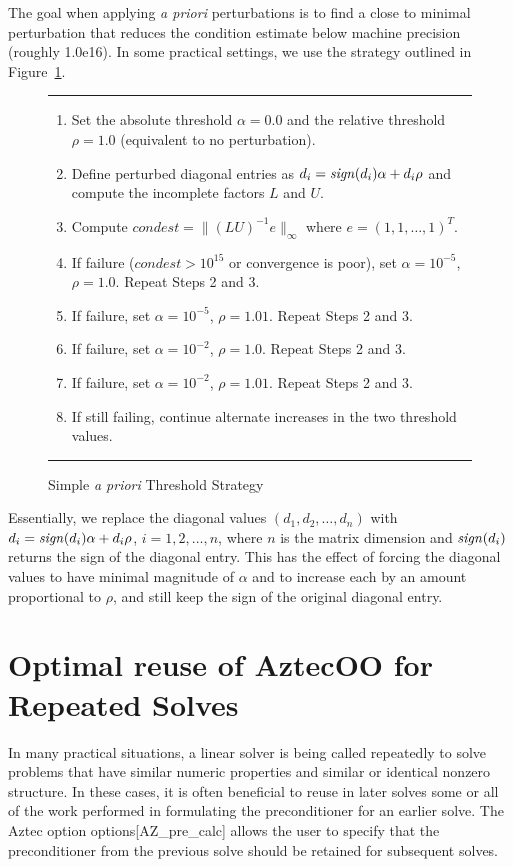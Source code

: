 \documentclass[12pt,relax]{AztecOOUserGuide}
\newcommand{\sign}{{\it sign}}
\begin{document}
The goal when applying {\it a priori} perturbations is to find a close to minimal
perturbation that reduces the condition estimate below machine
precision (roughly 1.0e16).  In some practical settings, 
we use the strategy outlined in
Figure~\ref{f:aprioristrategy}.
{\small
\begin{figure}
\vspace{.05in}
\hrule
\vspace{.1in}
\begin{enumerate}
\item Set the absolute threshold $\alpha = 0.0$ and the relative
threshold $\rho = 1.0$ (equivalent to no perturbation).
\item Define perturbed diagonal entries as $d_{i} = \sign(d_i)\alpha +
d_i\rho$ and compute the incomplete factors $L$ and $U$.
\item Compute $condest = \|(LU)^{-1}e\|_\infty$ where $e = (1, 1,
\ldots, 1)^T$.
\item If failure ($condest > 10^{15}$ or convergence is poor), set $\alpha =
10^{-5}$, $\rho = 1.0$.  Repeat Steps 2 and 3.
\item If failure, set $\alpha =
10^{-5}$, $\rho = 1.01$. Repeat Steps 2 and 3.
\item If failure, set $\alpha =
10^{-2}$, $\rho = 1.0$. Repeat Steps 2 and 3.
\item If failure, set $\alpha =
10^{-2}$, $\rho = 1.01$. Repeat Steps 2 and 3.
\item If still failing, continue alternate increases in
   the two threshold values.
\end{enumerate}
\vspace{.1in}
\hrule
\caption{Simple {\it a priori} Threshold Strategy}
\label{f:aprioristrategy}
\end{figure}
}
Essentially, we replace the diagonal values $(d_1, d_2, \ldots, d_n)$
with $d_i = \sign(d_i)\alpha + d_i\rho$, $i=1, 2, \ldots, n$, where
$n$ is the matrix dimension and $\sign(d_i)$ returns
the sign of the diagonal entry.  This has the effect of
forcing the diagonal values to have minimal magnitude of $\alpha$ and
to increase each by an amount proportional to $\rho$, and still keep
the sign of the original diagonal entry.


\section {Optimal reuse of AztecOO for Repeated Solves}

In many practical situations, a linear solver is being called
repeatedly to solve problems that have similar numeric properties and
similar or identical nonzero structure.  In these cases, it is often
beneficial to reuse in later solves some or all of the work performed
in formulating the preconditioner for an earlier solve.  The Aztec
option options[{\sf AZ\_pre\_calc}] allows the user to specify that the
preconditioner from the previous solve should be retained for
subsequent solves.  
\end{document}
